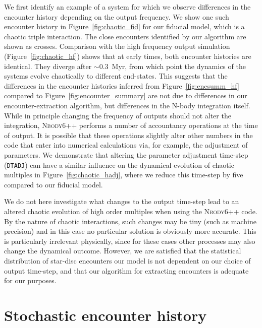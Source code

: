 \documentclass{aa}
\begin{document}
We first identify an example of a system for which we observe differences in the encounter history depending on the output frequency. We show one such encounter history in Figure~\ref{fig:chaotic_fid} for our fiducial model, which is a chaotic triple interaction. The close encounters identified by our algorithm are shown as crosses. Comparison with the high frequency output simulation (Figure~\ref{fig:chaotic_hf}) shows that at early times, both encounter histories are identical. They diverge after $\sim 0.3$~Myr, from which point the dynamics of the systems evolve chaotically to different end-states. This suggests that the differences in the encounter histories inferred from Figure~\ref{fig:encsumm_hf} compared to Figure~\ref{fig:encounter_summary} are not due to differences in our encounter-extraction algorithm, but differences in the N-body integration itself. While in principle changing the frequency of outputs should not alter the integration, \textsc{Nbody6++} performs a number of accountancy operations at the time of output. It is possible that these operations slightly alter other numbers in the code that enter into numerical calculations via, for example, the adjustment of parameters. We demonstrate that altering the parameter adjustment time-step (\texttt{DTADJ}) can have a similar influence on the dynamical evolution of chaotic multiples in Figure~\ref{fig:chaotic_hadj}, where we reduce this time-step by five compared to our fiducial model. 

We do not here investigate what changes to the output time-step lead to an altered chaotic evolution of high order multiples when using the \textsc{Nbody6++} code. By the nature of chaotic interactions, such changes may be tiny (such as machine precision) and in this case no particular solution is obviously more accurate. This is particularly irrelevant physically, since for these cases other processes may also change the dynamical outcome. However, we are satisfied that the statistical distribution of star-disc encounters our model is not dependent on our choice of output time-step, and that our algorithm for extracting encounters is adequate for our purposes. 


\section{Stochastic encounter history}

\label{app:stochastic}
\end{document}
